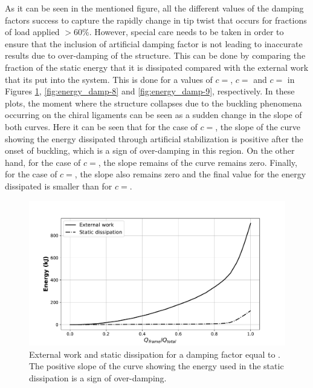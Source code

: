     As it can be seen in the mentioned figure, all the different values of the damping factors success to capture the rapidly change in tip twist that occurs for fractions of load applied $>60\%$. However, special care needs to be taken in order to ensure that the inclusion of artificial damping factor is not leading to inaccurate results due to over-damping of the structure. This can be done by comparing the fraction of the static energy that it is dissipated compared with the external work that its put into the system. This is done for a values of $c =$, $c =$ and $c =$ in Figures \ref{fig:energy_damp-5}, \ref{fig:energy_damp-8} and \ref{fig:energy_damp-9}, respectively. In these plots, the moment where the structure collapses due to the buckling phenomena occurring on the chiral ligaments can be seen as a sudden change in the slope of both curves. Here it can be seen that for the case of $c =$, the slope of the curve showing the energy dissipated through artificial stabilization is positive after the onset of buckling, which is a sign of over-damping in this region. On the other hand, for the case of $c =$, the slope remains of the curve remains zero. Finally, for the case of $c =$, the slope also remains zero and the final value for the energy dissipated is smaller than for $c =$.

    \begin{figure}[!htpb]
      \centering
      \includegraphics[width=0.8 \textwidth]{../figures/result-model/energy_damp-5}
      \caption[External work and static dissipation for a damping factor equal to ]{External work and static dissipation for a damping factor equal to . The positive slope of the curve showing the energy used in the static dissipation is a sign of over-damping.}\label{fig:energy_damp-5}
    \end{figure}

